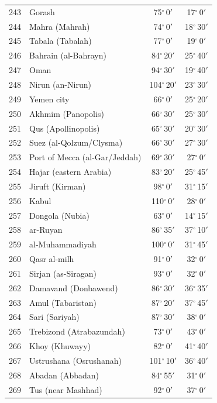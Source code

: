\documentclass[10pt,a4paper]{article}
\begin{document}
\begin{longtable}{r >{\raggedright\arraybackslash}p{8.5cm} c c}
243 & Gorash & 75$^\circ$\,0$'$ & 17$^\circ$\,0$'$\\
244 & Mahra (Mahrah) & 74$^\circ$\,0$'$ & 18$^\circ$\,30$'$\\
245 & Tabala (Tabalah) & 77$^\circ$\,0$'$ & 19$^\circ$\,0$'$\\
246 & Bahrain (al-Bahrayn) & 84$^\circ$\,20$'$ & 25$^\circ$\,40$'$\\
247 & Oman & 94$^\circ$\,30$'$ & 19$^\circ$\,40$'$\\
248 & Nirun (an-Nirun) & 104$^\circ$\,20$'$ & 23$^\circ$\,30$'$\\
249 & Yemen city & 66$^\circ$\,0$'$ & 25$^\circ$\,20$'$\\
250 & Akhmim (Panopolis) & 66$^\circ$\,30$'$ & 25$^\circ$\,30$'$\\
251 & Qus (Apollinopolis) & 65$^\circ$\,30$'$ & 20$^\circ$\,30$'$\\
252 & Suez (al-Qolzum/Clysma) & 66$^\circ$\,30$'$ & 27$^\circ$\,30$'$\\
253 & Port of Mecca (al-Gar/Jeddah) & 69$^\circ$\,30$'$ & 27$^\circ$\,0$'$\\
254 & Hajar (eastern Arabia) & 83$^\circ$\,20$'$ & 25$^\circ$\,45$'$\\
255 & Jiruft (Kirman) & 98$^\circ$\,0$'$ & 31$^\circ$\,15$'$\\
256 & Kabul & 110$^\circ$\,0$'$ & 28$^\circ$\,0$'$\\
257 & Dongola (Nubia) & 63$^\circ$\,0$'$ & 14$^\circ$\,15$'$\\
258 & ar-Ruyan & 86$^\circ$\,35$'$ & 37$^\circ$\,10$'$\\
259 & al-Muhammadiyah & 100$^\circ$\,0$'$ & 31$^\circ$\,45$'$\\
260 & Qasr al-milh & 91$^\circ$\,0$'$ & 32$^\circ$\,0$'$\\
261 & Sirjan (as-Siragan) & 93$^\circ$\,0$'$ & 32$^\circ$\,0$'$\\
262 & Damavand (Donbawend) & 86$^\circ$\,30$'$ & 36$^\circ$\,35$'$\\
263 & Amul (Tabaristan) & 87$^\circ$\,20$'$ & 37$^\circ$\,45$'$\\
264 & Sari (Sariyah) & 87$^\circ$\,30$'$ & 38$^\circ$\,0$'$\\
265 & Trebizond (Atrabazundah) & 73$^\circ$\,0$'$ & 43$^\circ$\,0$'$\\
266 & Khoy (Khuwayy) & 82$^\circ$\,0$'$ & 41$^\circ$\,40$'$\\
267 & Ustrushana (Osrushanah) & 101$^\circ$\,10$'$ & 36$^\circ$\,40$'$\\
268 & Abadan (Abbadan) & 84$^\circ$\,55$'$ & 31$^\circ$\,0$'$\\
269 & Tus (near Mashhad) & 92$^\circ$\,0$'$ & 37$^\circ$\,0$'$\\
\bottomrule\end{longtable}\vspace{4pt}
\end{document}

